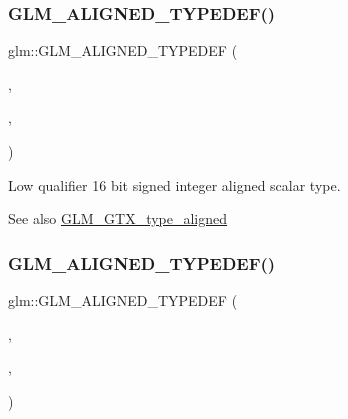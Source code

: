 \subsubsection{\texorpdfstring{G\+L\+M\+\_\+\+A\+L\+I\+G\+N\+E\+D\+\_\+\+T\+Y\+P\+E\+D\+E\+F()}{GLM\_ALIGNED\_TYPEDEF()}\hspace{0.1cm}{\footnotesize\ttfamily [10/209]}}
{\footnotesize\ttfamily glm\+::\+G\+L\+M\+\_\+\+A\+L\+I\+G\+N\+E\+D\+\_\+\+T\+Y\+P\+E\+D\+EF (\begin{DoxyParamCaption}\item[{\hyperlink{group__gtc__type__precision_gaf7bbfd31bcec25a416ea94d09efb5451}{lowp\+\_\+i16}}]{,  }\item[{aligned\+\_\+lowp\+\_\+i16}]{,  }\item[{2}]{ }\end{DoxyParamCaption})}

Low qualifier 16 bit signed integer aligned scalar type. \begin{DoxySeeAlso}{See also}
\hyperlink{group__gtx__type__aligned}{G\+L\+M\+\_\+\+G\+T\+X\+\_\+type\+\_\+aligned} 
\end{DoxySeeAlso}
\mbox{\label{group__gtx__type__aligned_gaa07e98e67b7a3435c0746018c7a2a839}} 
\subsubsection{\texorpdfstring{G\+L\+M\+\_\+\+A\+L\+I\+G\+N\+E\+D\+\_\+\+T\+Y\+P\+E\+D\+E\+F()}{GLM\_ALIGNED\_TYPEDEF()}\hspace{0.1cm}{\footnotesize\ttfamily [11/209]}}
{\footnotesize\ttfamily glm\+::\+G\+L\+M\+\_\+\+A\+L\+I\+G\+N\+E\+D\+\_\+\+T\+Y\+P\+E\+D\+EF (\begin{DoxyParamCaption}\item[{\hyperlink{group__gtc__type__precision_ga70fd34e8b8cffc92739161284ed77328}{lowp\+\_\+i32}}]{,  }\item[{aligned\+\_\+lowp\+\_\+i32}]{,  }\item[{4}]{ }\end{DoxyParamCaption})}

